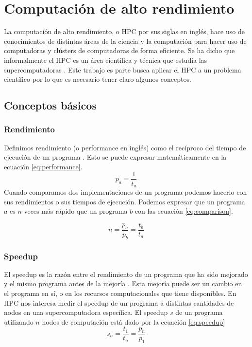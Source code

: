 \section{Computación de alto rendimiento}
La computación de alto rendimiento, o HPC por sus siglas en inglés, hace uso de conocimientos de distintas áreas de la ciencia y la computación para hacer uso de computadoras y clústers de computadoras de forma eficiente. Se ha dicho que informalmente el HPC es un área científica y técnica que estudia las supercomputadoras \cite{Nielsen2016}. Este trabajo es parte busca aplicar el HPC a un problema científico por lo que es necesario tener claro algunos conceptos.
\subsection{Conceptos básicos}
\subsubsection{Rendimiento}
Definimos rendimiento (o performance en inglés) como el recíproco del tiempo de ejecución de un programa \cite{Hennessy2017-ml}. Esto se puede expresar matemáticamente en la ecuación \ref{eq:performance}.
\begin{equation}
p_{a} = \frac{1}{t_a}
\label{eq:performance}
\end{equation}
Cuando comparamos dos implementaciones de un programa podemos hacerlo con sus rendimientos o sus tiempos de ejecución. Podemos expresar que un programa $a$ es $n$ veces más rápido que un programa $b$ con las ecuación \ref{eq:comparison}.

\begin{equation}
  n = \frac{p_a}{p_b} = \frac{t_b}{t_a}
  \label{eq:comparison}
\end{equation}

\subsubsection{Speedup}
El speedup es la razón entre el rendimiento de un programa que ha sido mejorado y el mismo programa antes de la mejoría \cite{Hennessy2017-ml}. Esta mejoría puede ser un cambio en el programa en sí, o en los recursos computacionales que tiene disponibles.
En HPC nos interesa medir el speedup de un programa a distintas cantidades de nodos en una supercomputadora específica. El speedup $s$ de un programa utilizando $n$ nodos de computación está dado por la ecuación \ref{eq:speedup}
\begin{equation}
  s_n = \frac{t_1}{t_n} = \frac{p_n}{p_1}
  \label{eq:speedup}
\end{equation}
